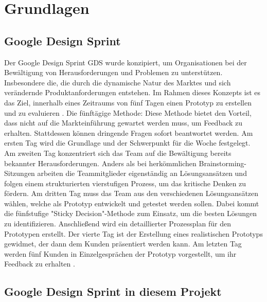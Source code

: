 \chapter{Grundlagen}

\section{Google Design Sprint}
Der Google Design Sprint \ac{GDS} wurde konzipiert, um Organisationen bei der Bewältigung von Herausforderungen und Problemen zu unterstützen. Insbesondere die, die durch die dynamische Natur des Marktes und sich verändernde Produktanforderungen entstehen. Im Rahmen dieses Konzepts ist es das Ziel, innerhalb eines Zeitraums von fünf Tagen einen Prototyp zu erstellen und zu evaluieren \cite[vgl.][S.98]{Design_Sprint}.
Die fünftägige Methode:
Diese Methode bietet den Vorteil, dass nicht auf die Markteinführung gewartet werden muss, um Feedback zu erhalten. Stattdessen können dringende Fragen sofort beantwortet werden.
Am ersten Tag wird die Grundlage und der Schwerpunkt für die Woche festgelegt. Am zweiten Tag konzentriert sich das Team auf die Bewältigung bereits bekannter Herausforderungen. Anders als bei herkömmlichen Brainstorming-Sitzungen arbeiten die Teammitglieder eigenständig an Lösungsansätzen und folgen einem strukturierten vierstufigen Prozess, um das kritische Denken zu fördern.
Am dritten Tag muss das Team aus den verschiedenen Lösungsansätzen wählen, welche als Prototyp entwickelt und getestet werden sollen. Dabei kommt die fünfstufige "Sticky Decision"-Methode zum Einsatz, um die besten Lösungen zu identifizieren. Anschließend wird ein detaillierter Prozessplan für den Prototypen erstellt. 
Der vierte Tag ist der Erstellung eines realistischen Prototyps gewidmet, der dann dem Kunden präsentiert werden kann. Am letzten Tag werden fünf Kunden in Einzelgesprächen der Prototyp vorgestellt, um ihr Feedback zu erhalten \cite[vgl.][S.99]{Design_Sprint}.

\section{Google Design Sprint in diesem Projekt}